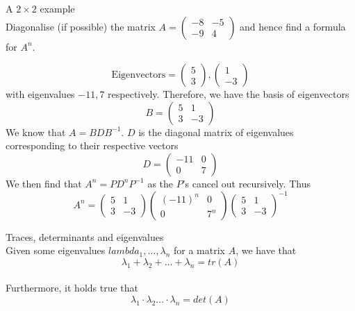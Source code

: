 \documentclass[journal, letterpaper]{IEEEtran}
\begin{document}
    \begin{myboxg}{A $2 \times 2$ example} \\
        Diagonalise (if possible) the matrix $A = \begin{pmatrix}
            -8 & -5 \\ -9 & 4
        \end{pmatrix}$ and hence find a formula for $A^n$. 

        $$\text{Eigenvectors} =  \begin{pmatrix}
            5 \\ 3
        \end{pmatrix}, \begin{pmatrix}
            1 \\ -3
        \end{pmatrix}$$
        with eigenvalues $-11, 7$ respectively.
        Therefore, we have the basis of eigenvectors
        $$ B = \begin{pmatrix}
            5 & 1 \\ 3 & -3
        \end{pmatrix}$$
        We know that $A =  BDB^{-1}$. $D$ is the diagonal matrix of eigenvalues corresponding to their respective vectors
        $$ D = \begin{pmatrix}
            -11 & 0 \\ 0 & 7
        \end{pmatrix}$$
        We then find that $A^n = PD^nP^{-1}$ as the $P$'s cancel out recursively. Thus
        $$ A^n = \begin{pmatrix}
            5 & 1 \\ 3 & -3
        \end{pmatrix}\begin{pmatrix}
            (-11)^n & 0 \\ 0 & 7^n
        \end{pmatrix}\begin{pmatrix}
            5 & 1 \\ 3 & -3
        \end{pmatrix}^{-1}$$
    \end{myboxg}
    \begin{myboxr}{Traces, determinants and eigenvalues} \\ 
        Given some eigenvalues $lambda_1, \dots, \lambda_n$ for a matrix $A$, we have that
        $$ \lambda_1 + \lambda_2 + \dots + \lambda_n = tr(A)$$
        \newline \\ 
        Furthermore, it holds true that
        $$ \lambda_1 \cdot \lambda_2 \dots \cdot \lambda_n = det(A)$$
    \end{myboxr}
\end{document}
